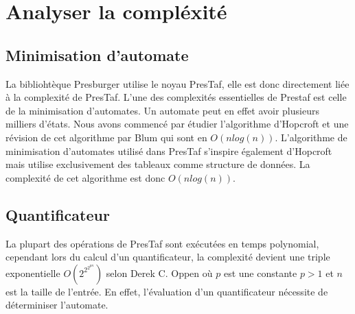 \section{Analyser la compléxité}

\subsection{Minimisation d'automate}

La bibliohtèque Presburger utilise le noyau PresTaf, elle est donc directement liée à la complexité de PresTaf. L'une des complexités essentielles de Prestaf est celle de la minimisation d'automates. Un automate peut en effet avoir plusieurs milliers d'états. Nous avons commencé par étudier l'algorithme d'Hopcroft et une révision de cet algorithme par Blum qui sont en $O(nlog(n))$. L'algorithme de minimisation d'automates utilisé dans PresTaf s'inspire également d'Hopcroft mais utilise exclusivement des tableaux comme structure de données. La complexité de cet algorithme est donc $O(nlog(n))$. 

\subsection{Quantificateur}

La plupart des opérations de PresTaf sont exécutées en temps polynomial, cependant lors du calcul d'un quantificateur, la complexité devient une triple exponentielle $O(2^{2^{2^{pn}}})$ selon Derek C. Oppen\cite{oppen1978222pn} où $p$ est une constante $p > 1$ et $n$ est la taille de l'entrée. En effet, l'évaluation d'un quantificateur nécessite de déterminiser l'automate.
